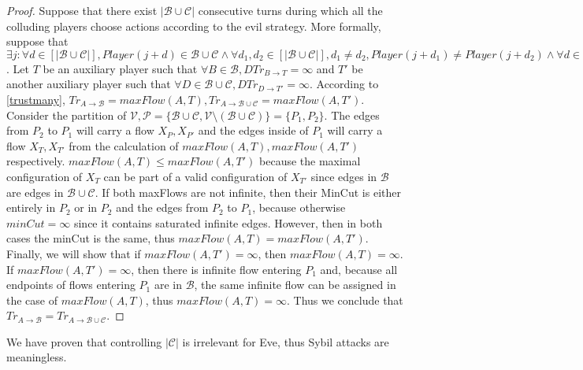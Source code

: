 \documentclass[11pt]{article}
\theoremstyle{definition}
\theoremstyle{corollary}
\theoremstyle{lemma}
\begin{document}
    \begin{proof}
       Suppose that there exist $|\mathcal{B} \cup \mathcal{C}|$ consecutive turns during which all the colluding players
       choose actions according to the evil strategy. More formally, suppose that $\exists j: \forall d \in [|\mathcal{B}
       \cup \mathcal{C}|], Player(j+d) \in \mathcal{B} \cup \mathcal{C} \wedge \forall d_1, d_2 \in [|\mathcal{B} \cup
       \mathcal{C}|], d_1 \neq d_2, Player(j + d_1) \neq Player(j + d_2) \wedge \forall d \in [|\mathcal{B} \cup
       \mathcal{C}|], Strategy(Player(j+d)) = Evil$. Let $T$ be an auxiliary player such that $\forall B \in \mathcal{B},
       DTr_{B \rightarrow T} = \infty$ and $T'$ be another auxiliary player such that $\forall D \in \mathcal{B} \cup
       \mathcal{C}, DTr_{D \rightarrow T'} = \infty$. According to \ref{trustmany}, $Tr_{A \rightarrow \mathcal{B}} =
       maxFlow(A, T), Tr_{A \rightarrow \mathcal{B} \cup \mathcal{C}} = maxFlow(A, T')$. Consider the partition of
       $\mathcal{V}, \mathcal{P} = \{\mathcal{B} \cup \mathcal{C}, \mathcal{V} \setminus (\mathcal{B} \cup \mathcal{C})\} =
       \{P_1, P_2\}$. The edges from $P_2$ to $P_1$ will carry a flow $X_P, X_{P'}$ and the edges inside of $P_1$ will carry
       a flow $X_T, X_{T'}$ from the calculation of $maxFlow(A, T), maxFlow(A, T')$ respectively. $maxFlow(A, T) \leq
       maxFlow(A, T')$ because the maximal configuration of $X_T$ can be part of a valid configuration of $X_{T'}$ since
       edges in $\mathcal{B}$ are edges in $\mathcal{B} \cup \mathcal{C}$. If both maxFlows are not infinite, then their
       MinCut is either entirely in $P_2$ or in $P_2$ and the edges from $P_2$ to $P_1$, because otherwise $minCut = \infty$
       since it contains saturated infinite edges. However, then in both cases the minCut is the same, thus $maxFlow(A, T) =
       maxFlow(A, T')$. Finally, we will show that if $maxFlow(A, T') = \infty$, then $maxFlow(A, T) = \infty$. If
       $maxFlow(A, T') = \infty$, then there is infinite flow entering $P_1$ and, because all endpoints of flows entering
       $P_1$ are in $\mathcal{B}$, the same infinite flow can be assigned in the case of $maxFlow(A, T)$, thus
       $maxFlow(A, T) = \infty$. Thus we conclude that $Tr_{A \rightarrow \mathcal{B}} =
       Tr_{A \rightarrow \mathcal{B} \cup \mathcal{C}}$.
    \end{proof}
    We have proven that controlling $|\mathcal{C}|$ is irrelevant for Eve, thus Sybil attacks are meaningless. \\
\end{document}
